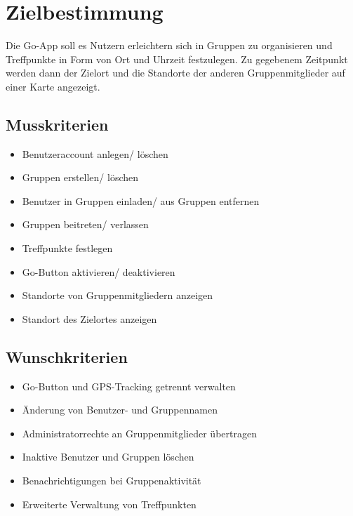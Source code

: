 \section{Zielbestimmung}
Die Go-App soll es Nutzern erleichtern sich in Gruppen zu organisieren
und Treffpunkte in Form von Ort und Uhrzeit festzulegen. Zu gegebenem Zeitpunkt werden dann der Zielort und die Standorte der anderen Gruppenmitglieder auf einer Karte angezeigt.


\subsection{Musskriterien}
\begin{itemize}
	\item Benutzeraccount anlegen/ löschen
	\item Gruppen erstellen/ löschen
	\item Benutzer in Gruppen einladen/ aus Gruppen entfernen
	\item Gruppen beitreten/ verlassen
	\item Treffpunkte festlegen
	\item Go-Button aktivieren/ deaktivieren
	\item Standorte von Gruppenmitgliedern anzeigen
	\item Standort des Zielortes anzeigen
\end{itemize}

\subsection{Wunschkriterien}
\begin{itemize}
	\item Go-Button und GPS-Tracking getrennt verwalten
	\item Änderung von Benutzer- und Gruppennamen
	\item Administratorrechte an Gruppenmitglieder übertragen
	\item Inaktive Benutzer und Gruppen löschen	
	\item Benachrichtigungen bei Gruppenaktivität
	\item Erweiterte Verwaltung von Treffpunkten
\end{itemize}

